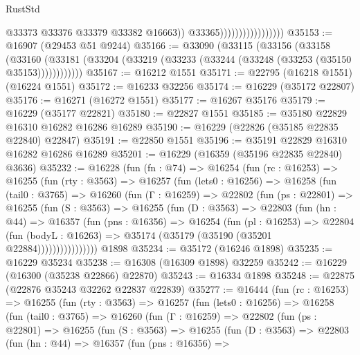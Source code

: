 \begin{lexlean}{RustStd}
\begin{coremodule}
                                          @33373
                                          @33376
                                          @33379
                                          @33382
                                          @16663))
                                      @33365)))))))))))))))))
@35153 := @16907 (@29453 @51 @9244)
@35166 := @33090
    (@33115
      (@33156
        (@33158
          (@33160 (@33181 (@33204 (@33219 (@33233 (@33244 (@33248 (@33253 (@35150 @35153))))))))))))
@35167 := @16212 @1551
@35171 := @22795 (@16218 @1551) (@16224 @1551)
@35172 := @16233 @32256
@35174 := @16229 (@35172 @22807)
@35176 := @16271 (@16272 @1551)
@35177 := @16267 @35176
@35179 := @16229 (@35177 @22821)
@35180 := @22827 @1551
@35185 := @35180 @22829 @16310 @16282 @16286 @16289
@35190 := @16229 (@22826 (@35185 @22835 @22840) @22847)
@35191 := @22850 @1551
@35196 := @35191 @22829 @16310 @16282 @16286 @16289
@35201 := @16229 (@16359 (@35196 @22835 @22840) @3636)
@35232 := @16228
    (fun (fn : @74) =>
    @16254
      (fun (rc : @16253) =>
      @16255
        (fun (rty : @3563) =>
        @16257
          (fun (lets0 : @16256) =>
          @16258
            (fun (tail0 : @3765) =>
            @16260
              (fun (Γ : @16259) =>
              @22802
                (fun (ps : @22801) =>
                @16255
                  (fun (S : @3563) =>
                  @16255
                    (fun (D : @3563) =>
                    @22803
                      (fun (hn : @44) =>
                      @16357
                        (fun (pns : @16356) =>
                        @16254
                          (fun (pl : @16253) =>
                          @22804
                            (fun (bodyL : @16263) =>
                            @35174 (@35179 (@35190 (@35201 @22884))))))))))))))))
    @1898
@35234 := @35172 (@16246 @1898)
@35235 := @16229 @35234
@35238 := @16308 (@16309 @1898) @32259
@35242 := @16229 (@16300 (@35238 @22866) @22870)
@35243 := @16334 @1898
@35248 := @22875 (@22876 @35243 @32262 @22837 @22839)
@35277 := @16444
    (fun (rc : @16253) =>
    @16255
      (fun (rty : @3563) =>
      @16257
        (fun (lets0 : @16256) =>
        @16258
          (fun (tail0 : @3765) =>
          @16260
            (fun (Γ : @16259) =>
            @22802
              (fun (ps : @22801) =>
              @16255
                (fun (S : @3563) =>
                @16255
                  (fun (D : @3563) =>
                  @22803
                    (fun (hn : @44) =>
                    @16357
                      (fun (pns : @16356) =>

\end{coremodule}
\end{lexlean}
